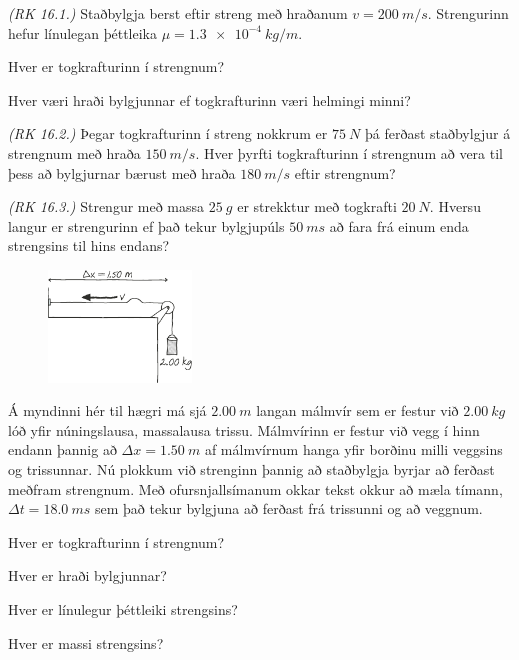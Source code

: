 \begin{enumerate}[label = \textbf{Dæmi \thechapter.\arabic*.}]

\item  \textit{(RK 16.1.)} Staðbylgja berst eftir streng með hraðanum $v = \SI{200}{m/s}$. Strengurinn hefur línulegan þéttleika $\mu = \SI{1.3e-4}{kg/m}$. \begin{enumerate*}[label = \textbf{(\alph*)}]
    \item Hver er togkrafturinn í strengnum?
    \item Hver væri hraði bylgjunnar ef togkrafturinn væri helmingi minni?
\end{enumerate*}

\item  \textit{(RK 16.2.)} Þegar togkrafturinn í streng nokkrum er $\SI{75}{N}$ þá ferðast staðbylgjur á strengnum með hraða $\SI{150}{m/s}$. Hver þyrfti togkrafturinn í strengnum að vera til þess að bylgjurnar bærust með hraða $\SI{180}{m/s}$ eftir strengnum?

\item \textit{(RK 16.3.)} Strengur með massa $\SI{25}{g}$ er strekktur með togkrafti $\SI{20}{N}$. Hversu langur er strengurinn ef það tekur bylgjupúls $\SI{50}{ms}$ að fara frá einum enda strengsins til hins endans?

\begin{minipage}{\linewidth}

\begin{figure}
\includegraphics[width = 1.5in]{figures/waveslington.pdf}
\end{figure}

\item Á myndinni hér til hægri má sjá $\SI{2.00}{m}$ langan málmvír sem er festur við $\SI{2.00}{kg}$ lóð yfir núningslausa, massalausa trissu. Málmvírinn er festur við vegg í hinn endann þannig að $\Delta x = \SI{1.50}{m}$ af málmvírnum hanga yfir borðinu milli veggsins og trissunnar. Nú plokkum við strenginn þannig að staðbylgja byrjar að ferðast meðfram strengnum. Með ofursnjallsímanum okkar tekst okkur að mæla tímann, $\Delta t = \SI{18.0}{ms}$ sem það tekur bylgjuna að ferðast frá trissunni og að veggnum. \begin{enumerate*}[label = \textbf{(\alph*)}]
    \item Hver er togkrafturinn í strengnum?
    \item Hver er hraði bylgjunnar?
    \item Hver er línulegur þéttleiki strengsins?
    \item Hver er massi strengsins?
\end{enumerate*}
\end{minipage}


\end{enumerate}
